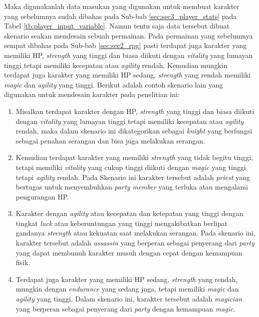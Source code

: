 Maka digunakanlah data masukan yang digunakan untuk membuat karakter yang sebelumnya sudah dibahas pada Sub-bab \ref{sec:sec3_player_stats} pada Tabel \ref{tb:player_input_variable}. Namun tentu saja data tersebut dibuat skenario seakan mendesain sebuah permainan. Pada permainan yang sebelumnya sempat dibahas pada Sub-bab \ref{sec:sec2_rpg} pasti terdapat juga karakter yang memiliki HP, \textit{strength} yang tinggi dan biasa diikuti dengan \textit{vitality} yang lumayan tinggi tetapi memiliki kecepatan atau \textit{agility} rendah. Kemudian mungkin terdapat juga karakter yang memiliki HP sedang, \textit{strength} yang rendah memiliki \textit{magic} dan \textit{agility} yang tinggi. Berikut adalah contoh skenario lain yang digunakan untuk mendesain karakter pada penelitian ini:

\begin{enumerate}[label=\arabic*).]
	\item Misalkan terdapat karakter dengan HP, \textit{strength} yang tinggi dan biasa diikuti dengan \textit{vitality} yang lumayan tinggi tetapi memiliki kecepatan atau \textit{agility} rendah, maka dalam skenario ini dikategorikan sebagai \textit{knight} yang berfungsi sebagai penahan serangan dan bisa juga melakukan serangan. 
	
	\item Kemudian terdapat karakter yang memiliki \textit{strength} yang tidak begitu tinggi, tetapi memiliki \textit{vitality} yang cukup tinggi diikuti dengan \textit{magic} yang tinggi tetapi \textit{agility} rendah. Pada Skenario ini karakter tersebut adalah \textit{priest} yang bertugas untuk menyembuhkan \textit{party member} yang terluka atau mengalami pengurangan HP. 
	
	\item Karakter dengan \textit{agility} atau kecepatan dan ketepatan yang tinggi dengan tingkat \textit{luck} atau keberuntungan yang tinggi mengakibatkan berlipat gandanya \textit{strength} atau kekuatan saat melakukan serangan. Pada skenario ini, karakter tersebut adalah \textit{assassin} yang berperan sebagai penyerang dari \textit{party} yang dapat membunuh karakter musuh dengan cepat dengan kemampuan fisik. 
	
	\item Terdapat juga karakter yang memiliki HP sedang, \textit{strength} yang rendah, mungkin dengan \textit{endurance} yang sedang juga, tetapi memiliki \textit{magic} dan \textit{agility} yang tinggi. Dalam skenario ini, karakter tersebut adalah \textit{magician} yang berperan sebagai penyerang dari \textit{party} dengan kemampuan \textit{magic}.
\end{enumerate}

